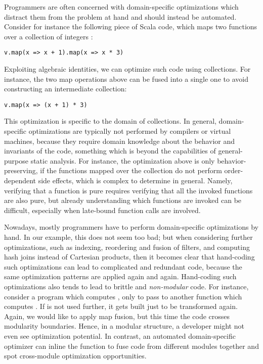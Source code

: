 Programmers
are often concerned with domain-specific optimizations which distract them from the problem at hand and should instead be automated.
Consider for instance the following piece of Scala code, which maps two functions over a collection of integers :

\begin{lstlisting}
v.map(x => x + 1).map(x => x * 3)
\end{lstlisting}

Exploiting algebraic identities, we can optimize such code using collections.
For instance, the two map operations above can be fused into a single one to avoid constructing an intermediate collection:

\begin{lstlisting}
v.map(x => (x + 1) * 3)
\end{lstlisting}

This optimization is specific to the domain of collections. In general, domain-specific optimizations are typically not performed by compilers or virtual machines, because they require domain knowledge
about the behavior and invariants of the code, something which is beyond the capabilities of general-purpose static analysis. For instance, the 
optimization above is only behavior-preserving, if the functions mapped over the collection do not perform order-dependent side effects,
which is complex to determine in general. Namely, verifying that a function is pure requires verifying that all the invoked functions are also pure, but already understanding which functions are invoked can be difficult, especially when late-bound function calls are involved.

Nowadays, mostly programmers have to perform domain-specific optimizations by hand. In our example, this does not seem too bad; but 
when considering further optimizations, such as indexing, reordering and fusion of filters, and computing hash joins
instead of Cartesian products, then it becomes clear that hand-coding such optimizations can lead to complicated
and redundant code, because the same optimization patterns are applied again and again. Hand-coding such optimizations also tends to lead to brittle and \emph{non-modular} code. For instance, consider a program which 
computes , only to pass  to another function which computes
. If  is not used further, it gets built just to be transformed again. Again, we would like to apply map fusion, but this time the code crosses modularity boundaries. Hence, in a modular structure, a developer might not even see optimization potential.
In contrast, an automated domain-specific optimizer can inline the function to fuse code from different modules together
 and spot cross-module optimization opportunities.

